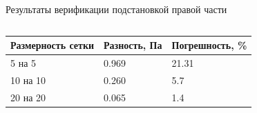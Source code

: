 \documentclass[ignoreonframetext,unicode]{beamer}
\begin{document}
\begin{frame}{Результаты верификации подстановкой правой части}
\begin{columns}
	\end{columns}

	\vspace*{-3mm}
\begin{table}[!htbp]
	\begin{tabular}{|l|l|l|}
		\hline
		\multicolumn{1}{|c|}{Размерность сетки} & \multicolumn{1}{c|}{Разность, Па} & Погрешность, \% \\ \hline
		5 на 5                                  & 0.969                              & 21.31            \\ \hline
		10 на 10                                & 0.260                              & 5.7            \\ \hline
		20 на 20                                & 0.065                              & 1.4            \\ \hline
	\end{tabular}
\end{table}
\end{frame}
\end{document}
